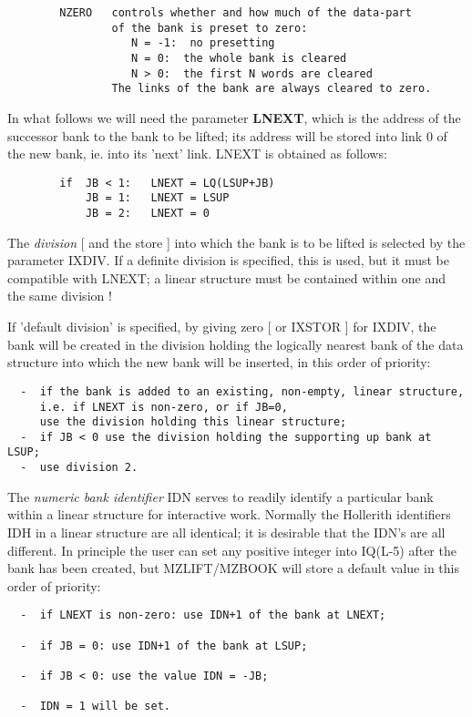 \begin{verbatim}
        NZERO   controls whether and how much of the data-part
                of the bank is preset to zero:
                   N = -1:  no presetting
                   N = 0:  the whole bank is cleared
                   N > 0:  the first N words are cleared
                The links of the bank are always cleared to zero.
\end{verbatim} 
In what follows we will need the parameter {\bf LNEXT},
which is the address of the successor bank to the bank to be lifted;
its address will be stored into link 0 of the new bank,
ie. into its 'next' link.
LNEXT is obtained as follows:
\begin{verbatim}
        if  JB < 1:   LNEXT = LQ(LSUP+JB)
            JB = 1:   LNEXT = LSUP
            JB = 2:   LNEXT = 0
\end{verbatim} 
The {\em division} [ and the store ] into which the bank
is to be lifted is selected by the parameter IXDIV.
If a definite division is specified, this is used,
but it must be compatible with LNEXT;
a linear structure must be contained within one and the same
division !

If 'default division' is specified,
by giving zero [ or IXSTOR ] for IXDIV,
the bank will be created in the division holding the logically
nearest bank of the data structure into which the new bank
will be inserted, in this order of priority:

\in{4mm}
\begin{verbatim}
  -  if the bank is added to an existing, non-empty, linear structure,
     i.e. if LNEXT is non-zero, or if JB=0,
     use the division holding this linear structure;
  -  if JB < 0 use the division holding the supporting up bank at LSUP;
  -  use division 2.

\end{verbatim} 
\in{-4mm}
The {\em numeric bank identifier} IDN serves to readily identify
a particular bank within a linear structure for interactive work.
Normally the Hollerith identifiers IDH in a linear structure are
all identical;
it is desirable that the IDN's are all different.
In principle the user can set any positive integer into IQ(L-5) after
the bank has been created, but MZLIFT/MZBOOK will store a default
value in this order of priority:

\in{4mm}
\begin{verbatim}
  -  if LNEXT is non-zero: use IDN+1 of the bank at LNEXT;

  -  if JB = 0: use IDN+1 of the bank at LSUP;

  -  if JB < 0: use the value IDN = -JB;

  -  IDN = 1 will be set.
\end{verbatim} 
\in{-4mm}


